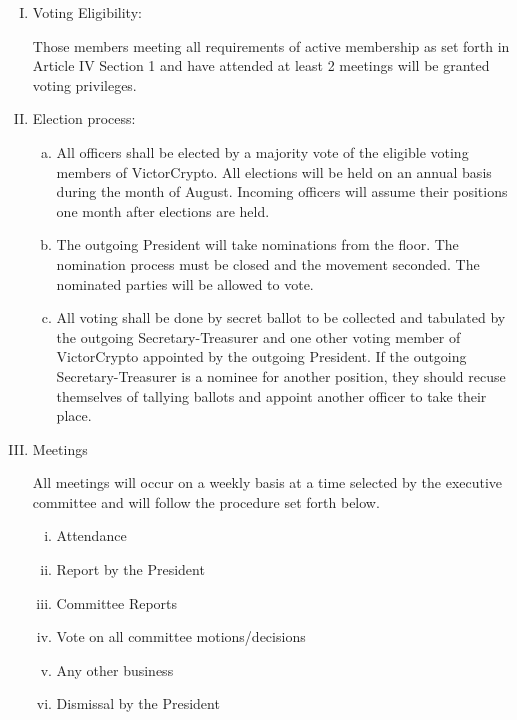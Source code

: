 \documentclass[11pt]{article}
\begin{document}
    \begin{enumerate}[I.]
        \item Voting Eligibility:

        Those members meeting all requirements of active membership as set forth in Article IV Section 1 and have
        attended at least 2 meetings will be granted voting privileges.

        \item Election process:
        \begin{enumerate}
            [a)]
            \item All officers shall be elected by a majority vote of the eligible voting members of VictorCrypto.
            All elections will be held on an annual basis during the month of August.
            Incoming officers will assume their positions one month after elections are held.
            \item The outgoing President will take nominations from the floor.
            The nomination process must be closed and the movement seconded.
            The nominated parties will be allowed to vote.
            \item All voting shall be done by secret ballot to be collected and tabulated by the outgoing
            Secretary-Treasurer and one other voting member of VictorCrypto appointed by the outgoing President.
            If the outgoing Secretary-Treasurer is a nominee for another position, they should recuse themselves of tallying ballots and appoint another officer to take their place.
        \end{enumerate}
        \item Meetings

        All meetings will occur on a weekly basis at a time selected by the executive committee and will follow the procedure set forth below.

        \begin{enumerate}
            [i)]
            \item Attendance
            \item Report by the President
            \item Committee Reports
            \item Vote on all committee motions/decisions
            \item Any other business
            \item Dismissal by the President
        \end{enumerate}

    \end{enumerate}
\end{document}
